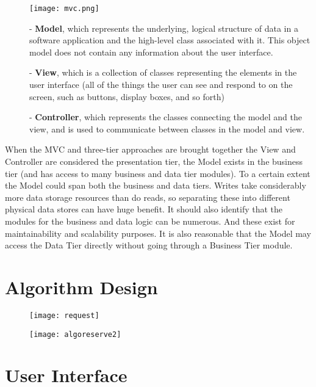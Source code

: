 \documentclass[12pt, oneside]{book}   	%
\begin{document}
\begin{figure}[h]
\center \texttt{[image: mvc.png]}
\end{figure}
\vspace{2cm}
\begin{description}
\item[]- \textbf{Model}, which represents the underlying, logical structure of data in a software application and the high-level class associated with it. This object model does not contain any information about the user interface.
\item[]- \textbf{View}, which is a collection of classes representing the elements in the user interface (all of the things the user can see and respond to on the screen, such as buttons, display boxes, and so forth)
\item[]- \textbf{Controller}, which represents the classes connecting the model and the view, and is used to communicate between classes in the model and view.
\end{description}
When the MVC and three-tier approaches are brought together the View and Controller are considered the presentation tier, the Model exists in the business tier (and has access to many business and data tier modules). To a certain extent the Model could span both the business and data tiers. Writes take considerably more data storage resources than do reads, so separating these into different physical data stores can have huge benefit. It should also identify that the modules for the business and data logic can be numerous. And these exist for maintainability and scalability purposes. It is also reasonable that the Model may access the Data Tier directly without going through a Business Tier module.
\clearpage
\chapter{Algorithm Design}
\begin{figure}[h]
\center \texttt{[image: request]}
\end{figure}
\clearpage
\begin{figure}[h]
\center \texttt{[image: algoreserve2]}
\end{figure}
\chapter{User Interface}
\end{document}
